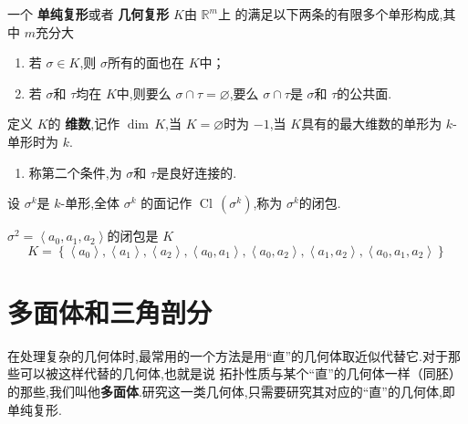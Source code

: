 \documentclass[../../几何与拓扑.tex]{subfiles}
\begin{document}
\begin{definition}
    一个  \textbf{单纯复形}或者 \textbf{几何复形 } \(  K  \)由 \(  \mathbb{R} ^{m}  \)上
    的满足以下两条的有限多个单形构成,其中 \(  m  \)充分大 
    \begin{enumerate}
        \item 若 \(   \sigma  \in K  \),则 \(   \sigma  \)所有的面也在 \(  K  \)中；
        \item 若 \(   \sigma   \)和 \(  \tau   \)均在 \(  K  \)中,则要么 \(   \sigma \cap \tau = \varnothing  \),要么 \(   \sigma \cap \tau   \)是 \(   \sigma   \)和 \(  \tau   \)的公共面.          
    \end{enumerate}
     定义 \(  K  \)的 \textbf{维数},记作 \(  \operatorname{dim}\,K  \),当 \(  K= \varnothing  \)时为 \(  -1  \),当 \(  K  \)具有的最大维数的单形为 \(  k  \)-单形时为 \(  k  \).       
\end{definition}

\begin{remark}
    \begin{enumerate}
        \item 称第二个条件,为 \(   \sigma   \)和 \(  \tau   \)是良好连接的.  
    \end{enumerate}
    
\end{remark}



\begin{definition}
    设 \(   \sigma ^{k}  \)是 \(  k  \)-单形,全体 \(   \sigma ^{k}  \)   的面记作 \(  \operatorname{Cl}\,\left(  \sigma ^{k} \right)   \),称为 \(   \sigma ^{k}  \)的闭包.  
\end{definition}
\begin{example}
    \(   \sigma ^{2}= \left<a_0,a_1,a_2 \right>  \)的闭包是 \(  K   \) \[
    K =  \left\{ \left<a_0 \right>,\left<a_1 \right>,\left<a_2 \right>,\left<a_0,a_1 \right>,\left<a_0,a_2 \right> ,\left<a_1,a_2 \right>,\left<a_0,a_1,a_2 \right>\right\}
    \]  
\end{example}

\hspace*{\fill} 


\section{多面体和三角剖分}

在处理复杂的几何体时,最常用的一个方法是用“直”的几何体取近似代替它.对于那些可以被这样代替的几何体,也就是说
拓扑性质与某个“直”的几何体一样（同胚）的那些,我们叫他\textbf{多面体}.研究这一类几何体,只需要研究其对应的“直”的几何体,即单纯复形.
\end{document}

